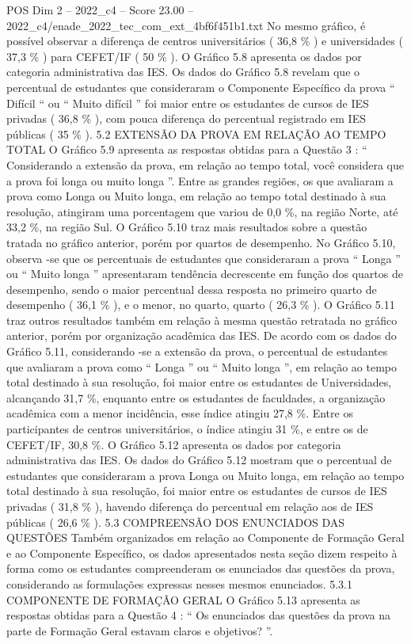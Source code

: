 \begin{textsample}{POS Dim 2 – 2022\_c4 – Score 23.00 – 2022\_c4/enade\_2022\_tec\_com\_ext\_4bf6f451b1.txt}
No mesmo gráfico, é possível observar a diferença de centros universitários ( 36,8 \% ) e universidades ( 37,3 \% ) para CEFET/IF ( 50 \% ).
O Gráfico 5.8 apresenta os dados por categoria administrativa das IES.
Os dados do Gráfico 5.8 revelam que o percentual de estudantes que consideraram o Componente Específico da prova “ Difícil “ ou “ Muito difícil ” foi maior entre os estudantes de cursos de IES privadas ( 36,8 \% ), com pouca diferença do percentual registrado em IES públicas ( 35 \% ). 5.2 EXTENSÃO DA PROVA EM RELAÇÃO AO TEMPO TOTAL O Gráfico 5.9 apresenta as respostas obtidas para a Questão 3 : “ Considerando a extensão da prova, em relação ao tempo total, você considera que a prova foi longa ou muito longa ”.
Entre as grandes regiões, os que avaliaram a prova como Longa ou Muito longa, em relação ao tempo total destinado à sua resolução, atingiram uma porcentagem que variou de 0,0 \%, na região Norte, até 33,2 \%, na região Sul.
O Gráfico 5.10 traz mais resultados sobre a questão tratada no gráfico anterior, porém por quartos de desempenho.
No Gráfico 5.10, observa -se que os percentuais de estudantes que consideraram a prova “ Longa ” ou “ Muito longa ” apresentaram tendência decrescente em função dos quartos de desempenho, sendo o maior percentual dessa resposta no primeiro quarto de desempenho ( 36,1 \% ), e o menor, no quarto, quarto ( 26,3 \% ).
O Gráfico 5.11 traz outros resultados também em relação à mesma questão retratada no gráfico anterior, porém por organização acadêmica das IES.
De acordo com os dados do Gráfico 5.11, considerando -se a extensão da prova, o percentual de estudantes que avaliaram a prova como “ Longa ” ou “ Muito longa ”, em relação ao tempo total destinado à sua resolução, foi maior entre os estudantes de Universidades, alcançando 31,7 \%, enquanto entre os estudantes de faculdades, a organização acadêmica com a menor incidência, esse índice atingiu 27,8 \%.
Entre os participantes de centros universitários, o índice atingiu 31 \%, e entre os de CEFET/IF, 30,8 \%.
O Gráfico 5.12 apresenta os dados por categoria administrativa das IES.
Os dados do Gráfico 5.12 mostram que o percentual de estudantes que consideraram a prova Longa ou Muito longa, em relação ao tempo total destinado à sua resolução, foi maior entre os estudantes de cursos de IES privadas ( 31,8 \% ), havendo diferença do percentual em relação aos de IES públicas ( 26,6 \% ). 5.3 COMPREENSÃO DOS ENUNCIADOS DAS QUESTÕES Também organizados em relação ao Componente de Formação Geral e ao Componente Específico, os dados apresentados nesta seção dizem respeito à forma como os estudantes compreenderam os enunciados das questões da prova, considerando as formulações expressas nesses mesmos enunciados. 5.3.1 COMPONENTE DE FORMAÇÃO GERAL O Gráfico 5.13 apresenta as respostas obtidas para a Questão 4 : “ Os enunciados das questões da prova na parte de Formação Geral estavam claros e objetivos? ”.

\end{textsample}

